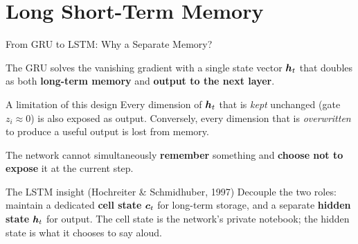 \documentclass[aspectratio=169]{beamer}
\begin{document}
\section{Long Short-Term Memory}
%
\begin{frame}{From GRU to LSTM: Why a Separate Memory?}

The GRU solves the vanishing gradient with a single state vector
$\bm{h}_t$ that doubles as both \textbf{long-term memory} and
\textbf{output to the next layer}.

\begin{block}{A limitation of this design}
Every dimension of $\bm{h}_t$ that is \emph{kept} unchanged
(gate $z_i \approx 0$) is also exposed as output.  Conversely,
every dimension that is \emph{overwritten} to produce a useful
output is lost from memory.

The network cannot simultaneously \textbf{remember} something
and \textbf{choose not to expose} it at the current step.
\end{block}

\begin{alertblock}{The LSTM insight (Hochreiter \& Schmidhuber, 1997)}
Decouple the two roles: maintain a dedicated \textbf{cell state}
$\bm{c}_t$ for long-term storage, and a separate \textbf{hidden
state} $\bm{h}_t$ for output.  The cell state is the network's
private notebook; the hidden state is what it chooses to say aloud.
\end{alertblock}

\end{frame}
%
%
\end{document}
